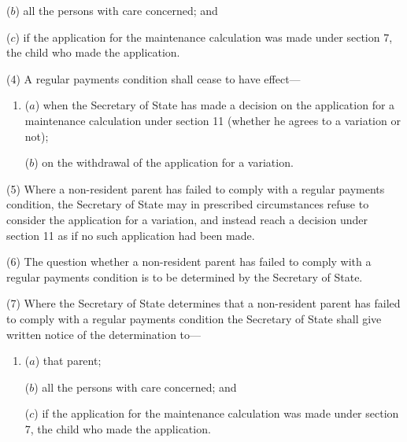 \documentclass[12pt,a4paper]{article}
\begin{document}
{\begin{enumerate}
($b$) all the persons with care concerned; and

($c$) if the application for the maintenance calculation was made under section
7, the child who made the application.
\end{enumerate}

(4) A regular payments condition shall cease to have effect---
\begin{enumerate}\item[]
($a$) when the Secretary of State has made a decision on the application for a
maintenance calculation under section 11 (whether he agrees to a variation
or not);

($b$) on the withdrawal of the application for a variation.
\end{enumerate}

(5) Where a non-resident parent has failed to comply with a regular payments condition, the Secretary of State may in prescribed circumstances refuse to consider the application for a variation, and instead reach a decision under section 11 as if no such application had been made.

(6)
The question whether a non-resident parent has failed to comply with a regular payments condition is to be determined by the Secretary of State.

(7)
Where the Secretary of State determines that a non-resident parent has failed to comply with a regular payments condition the Secretary of State shall give written notice of the determination to---
\begin{enumerate}\item[]
($a$) that parent;

($b$) all the persons with care concerned; and

($c$) if the application for the maintenance calculation was made under section 7, the child who made the application.
\end{enumerate}

}
\end{document}
